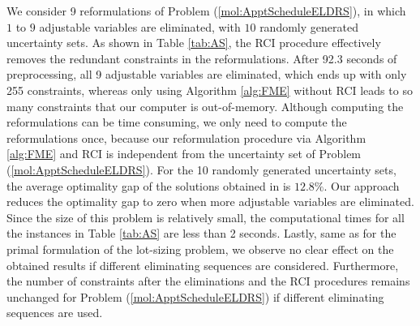 \documentclass[fleqn,isre,blindrev]{informs4}
\begin{document}
We consider 9 reformulations of Problem (\ref{mol:ApptScheduleELDRS}), in which $1$ to $9$ adjustable variables are eliminated, with $10$ randomly generated uncertainty sets.  As shown in Table \ref{tab:AS}, the RCI procedure effectively removes the redundant constraints in the reformulations. After 92.3 seconds of preprocessing, all 9 adjustable variables are eliminated, which ends up with only 255 constraints, whereas only using Algorithm \ref{alg:FME} without RCI leads to so many constraints that our computer is out-of-memory. Although computing the reformulations can be time consuming, we only need to compute the reformulations once, because our reformulation procedure via Algorithm \ref{alg:FME} and RCI is independent from the uncertainty set of Problem (\ref{mol:ApptScheduleELDRS}). For the 10 randomly generated uncertainty sets, the average optimality gap of the solutions obtained in \cite{bsz17} is $12.8\%$. Our approach reduces the optimality gap to zero when more adjustable variables are eliminated. Since the size of this problem is relatively small, the computational times for all the instances in Table \ref{tab:AS} are less than 2 seconds.  {Lastly, same as for the primal formulation of the lot-sizing problem, we observe no clear effect on the obtained results if different eliminating sequences are considered. Furthermore, the number of constraints after the eliminations and the RCI procedures remains unchanged for Problem (\ref{mol:ApptScheduleELDRS}) if different eliminating sequences are used.}
\end{document}
